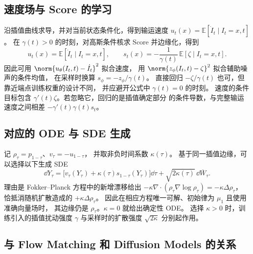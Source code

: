 \subsection{速度场与 Score 的学习}

沿插值曲线求导，并对当前状态条件化，得到输运速度
\(u_t(x)=\mathbb E[\dot I_t\mid I_t=x,t]\)。
在 \(\gamma(t)>0\) 的时刻，对高斯条件核求 Score 并边缘化，得到
\begin{equation}
  u_t(x)=\mathbb E[\dot I_t\mid I_t=x,t],\qquad
  s_t(x)=-\frac{1}{\gamma(t)}\,\mathbb E[\zeta\mid I_t=x,t] .
  \label{eq:overview-si-targets}
\end{equation}
因此可用 \(\norm{u_\theta(I_t,t)-\dot I_t}^2\) 拟合速度，
用 \(\norm{z_\phi(I_t,t)-\zeta}^2\) 拟合辅助噪声的条件均值，
在采样时换算 \(s_\phi=-z_\phi/\gamma(t)\)。
直接回归 \(-\zeta/\gamma(t)\) 也可，但靠近端点训练权重的设计不同，
并应避开公式中 \(\gamma(t)=0\) 的时刻。
速度的条件目标包含 \(\gamma'(t)\zeta\)。若忽略它，回归的是插值确定部分
的条件导数，与完整输运速度之间相差 \(-\gamma'(t)\gamma(t)s_t\)。

\subsection{对应的 ODE 与 SDE 生成}

记 \(\rho_\tau=p_{1-\tau}\)、\(v_\tau=-u_{1-\tau}\)，
并取非负时间系数 \(\kappa(\tau)\)。
基于同一插值边缘，可以选择以下生成 SDE
\begin{equation}
  \dd Y_\tau=\bigl[v_\tau(Y_\tau)+\kappa(\tau)
               s_{1-\tau}(Y_\tau)\bigr]\dd\tau
                 +\sqrt{2\kappa(\tau)}\,\dd\overline W_\tau .
  \label{eq:overview-si-sampling}
\end{equation}
理由是 Fokker--Planck 方程中的新增漂移给出
\(-\kappa\nabla\cdot(\rho_\tau\nabla\log\rho_\tau)
=-\kappa\Delta\rho_\tau\)，
恰抵消随机扩散造成的 \(+\kappa\Delta\rho_\tau\)。
因此在相应方程唯一可解、初始律为 \(\mu_1\) 且使用准确向量场时，
其边缘仍是 \(\rho_\tau\)。\(\kappa=0\) 就给出确定性 ODE。
选择 \(\kappa>0\) 时，训练引入的插值扰动强度 \(\gamma\)
与采样时的扩散强度 \(\sqrt{2\kappa}\) 分别起作用。

\subsection{与 Flow Matching 和 Diffusion Models 的关系}

